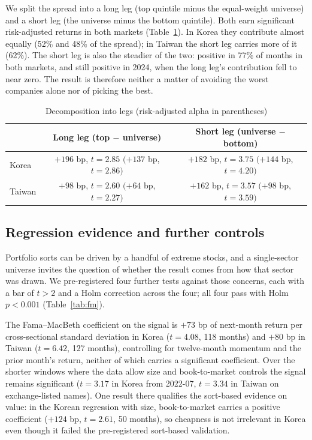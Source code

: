 \documentclass[12pt,a4paper]{article}
\begin{document}
We split the spread into a long leg (top quintile minus the equal-weight universe) and a short leg (the universe minus
the bottom quintile). Both earn significant risk-adjusted returns in both markets (Table~\ref{tab:legs}). In Korea they
contribute almost equally (52\% and 48\% of the spread); in Taiwan the short leg carries more of it (62\%). The short
leg is also the steadier of the two: positive in 77\% of months in both markets, and still positive in 2024, when the
long leg's contribution fell to near zero. The result is therefore neither a matter of avoiding the worst companies
alone nor of picking the best.

\begin{table}[!htbp]
\centering
\caption{Decomposition into legs (risk-adjusted alpha in parentheses)}
\label{tab:legs}
\small
\begin{tabular}{lcc}
\toprule
& Long leg (top $-$ universe) & Short leg (universe $-$ bottom) \\
\midrule
Korea  & $+196$ bp, $t=2.85$ $(+137$ bp, $t=2.86)$ & $+182$ bp, $t=3.75$ $(+144$ bp, $t=4.20)$ \\
Taiwan & $+98$ bp, $t=2.60$ $(+64$ bp, $t=2.27)$  & $+162$ bp, $t=3.57$ $(+98$ bp, $t=3.59)$ \\
\bottomrule
\end{tabular}
\end{table}

\subsection{Regression evidence and further controls}\label{sec:fm}

Portfolio sorts can be driven by a handful of extreme stocks, and a single-sector universe invites the question of
whether the result comes from how that sector was drawn. We pre-registered four further tests against those
concerns, each with a bar of $t>2$ and a Holm correction across the four; all four pass with Holm $p<0.001$
(Table~\ref{tab:fm}).

The Fama--MacBeth coefficient on the signal is $+73$ bp of next-month return per cross-sectional standard deviation in
Korea ($t=4.08$, 118 months) and $+80$ bp in Taiwan ($t=6.42$, 127 months), controlling for twelve-month momentum and
the prior month's return, neither of which carries a significant coefficient. Over the shorter windows where the
data allow size and book-to-market controls the signal remains significant ($t=3.17$ in Korea from 2022-07,
$t=3.34$ in Taiwan on exchange-listed names). One result there qualifies the sort-based evidence on value: in the
Korean regression with size, book-to-market carries a positive coefficient ($+124$ bp, $t=2.61$, 50 months), so
cheapness is not irrelevant in Korea even though it failed the pre-registered sort-based validation.
\end{document}
